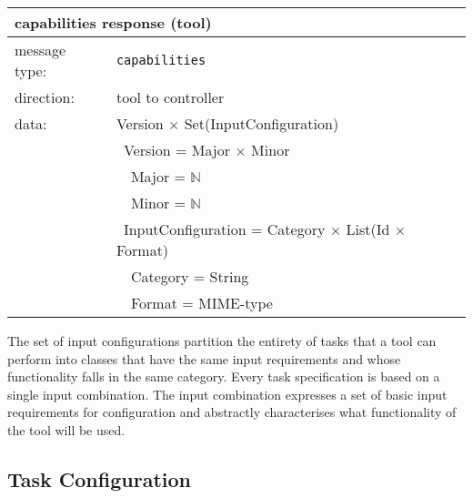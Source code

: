 \documentclass{article}
\newcommand{\msg}[1]{\texttt{#1}}
\begin{document}
   \begin{table}[H]
    \begin{center}
     \begin{tabular}{|ll|}
      \hline
       \multicolumn{2}{|l|}{\textbf{capabilities response (tool)}} \\
      \hline
       message type:   & \msg{capabilities} \\
      \hline
       direction:      & tool to controller \\
       data:           & Version $\times$ Set(InputConfiguration) \\
                       & \ Version = Major $\times$ Minor \\
                       & \ \ Major = $\mathbb{N}$ \\
                       & \ \ Minor = $\mathbb{N}$ \\
                       & \ InputConfiguration = Category $\times$ List(Id $\times$ Format) \\
                       & \ \ Category = String \\
                       & \ \ Format = MIME-type \\
      \hline
     \end{tabular}
    \end{center}
    \vspace{-0.3cm}
   \end{table}

   \noindent The set of input configurations partition the entirety of tasks
   that a tool can perform into classes that have the same input requirements
   and whose functionality falls in the same category. Every task specification
   is based on a single input combination. The input combination expresses a
   set of basic input requirements for configuration and abstractly
   characterises what functionality of the tool will be used.
   

  \subsection{Task Configuration} \label{ss::task_configuration}

\end{document}
